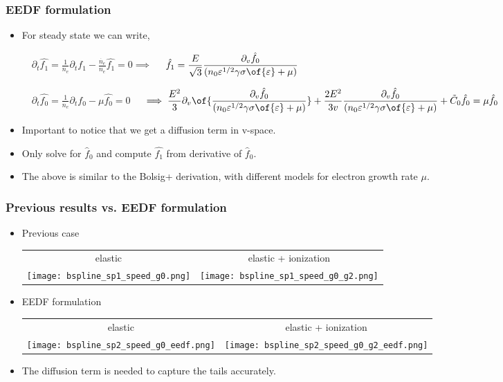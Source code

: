 \begin{frame}
	\frametitle{EEDF formulation}
	\begin{itemize}
		\item For steady state we can write, 
		\begin{center}
			$
			\displaystyle
			\quad
			\partial_t \hat{f_1} = \frac{1}{n_e} \partial_t f_1 - \frac{\dot{n_e}}{n_e} \hat{f_1} =0 \implies $
			$
			\displaystyle
			\quad
			\hat{f_1} = \frac{E}{\sqrt{3}} \frac{\partial_{v}\hat{f_0}}{(n_0 \varepsilon^{1/2}\gamma \sigma\of{\varepsilon} + \mu)}$
		\end{center}
		\begin{center}
			$
			\displaystyle
			\quad
			\partial_t \hat{f_0} = \frac{1}{n_e} \partial_t f_0 - \mu \hat{f_0} = 0$ 
			$
			\displaystyle
			\quad
			\implies
			\frac{E^2}{3} \partial_{v} \of{\frac{\partial_v \hat f_0}{(n_0 \varepsilon^{1/2}\gamma \sigma\of{\varepsilon} + \mu)}} + \frac{2E^2}{3v} \frac{\partial_v \hat{f_0}}{(n_0 \varepsilon^{1/2}\gamma \sigma\of{\varepsilon} + \mu)} + \tilde C_0 \hat{f_0} = \mu \hat{f_0}$
		\end{center}
		\item Important to notice that we get a diffusion term in v-space. 
		\item Only solve for $\hat{f}_0$ and compute $\hat{f_1}$ from derivative of $\hat{f}_0$.
		\item The above is similar to the Bolsig+ derivation, with different models for electron growth rate $\mu$. 
	\end{itemize}
\end{frame}

\begin{frame}[fragile]
	\frametitle{Previous results vs. EEDF formulation}
	\centering

		\only<+>
		{
			\begin{itemize}
			\item Previous case \\
			\centering
			\begin{tabular}{cc}
			elastic & elastic + ionization \\
			\texttt{[image: bspline\_sp1\_speed\_g0.png]} & 
			\texttt{[image: bspline\_sp1\_speed\_g0\_g2.png]} 
			\end{tabular}
			\end{itemize}
		}
		\only<+>
		{
			\begin{itemize}
				\item EEDF formulation \\
				\centering
				\begin{tabular}{cc}
					elastic & elastic + ionization \\
					\texttt{[image: bspline\_sp2\_speed\_g0\_eedf.png]} & 
					\texttt{[image: bspline\_sp2\_speed\_g0\_g2\_eedf.png]} 
				\end{tabular}
			\end{itemize}
		}
		\begin{itemize}
			\item The diffusion term is needed to capture the tails accurately. 
		\end{itemize}
\end{frame}

